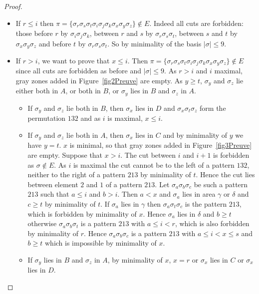 \documentclass[11pt]{article}
\begin{document}
\begin{proof}
\begin{itemize}
\begin{itemize}
\item If $r \leq i$ then $\pi = \{\sigma_r \sigma_s \sigma_t \sigma_i \sigma_j \sigma_k \sigma_x \sigma_y \sigma_z\} \notin E$. 
Indeed all cuts are forbidden: 
those before $r$ by $\sigma_i \sigma_j \sigma_k$, between $r$ and $s$ by $\sigma_r \sigma_s \sigma_t$, between $s$ and $t$ by $\sigma_x \sigma_y \sigma_z$ and before $t$ by $\sigma_r \sigma_s \sigma_t$. 
So by minimality of the basis $|\sigma| \leq 9$.
\item If $r > i$, we want to prove that $x \leq i$. 
Then $\pi = \{\sigma_r \sigma_s \sigma_t \sigma_i \sigma_j \sigma_k \sigma_x \sigma_y \sigma_z\} \notin E$ since all cuts are forbidden as before and $|\sigma| \leq 9$.
As $r > i$ and $i$ maximal, gray zones added in Figure~\ref{fig2Preuve} are empty. 
As $y \geq t$, $\sigma_y$ and $\sigma_z$ lie either both in $A$, or both in $B$, or $\sigma_y$ lies in $B$ and $\sigma_z$ in $A$.
\begin{itemize}
\item If $\sigma_y$ and $\sigma_z$ lie both in $B$, then $\sigma_x$ lies in $D$ and $\sigma_x \sigma_t \sigma_z$ form the permutation $132$ and as $i$ is maximal, $x \leq i$.
\item If $\sigma_y$ and $\sigma_z$ lie both in $A$, then $\sigma_x$ lies in $C$ and by minimality of $y$ we have $y = t$. 
$x$ is minimal, so that gray zones added in Figure~\ref{fig3Preuve} are empty. 
Suppose that $x > i$. 
The cut between $i$ and $i + 1$ is forbidden as $\sigma \notin E$. 
As $i$ is maximal the cut cannot be to the left of a pattern $132$, neither to the right of a pattern $213$ by minimality of $t$. 
Hence the cut lies between element $2$ and $1$ of a pattern $213$. 
Let $\sigma_a \sigma_b \sigma_c$ be such a pattern $213$ such that $a \leq i$ and $b > i$. 
Then $a < x$ and $\sigma_a$ lies in area $\gamma$ or $\delta$ and $c \geq t$ by minimality of $t$. 
If $\sigma_a$ lies in $\gamma$ then $\sigma_a \sigma_t \sigma_c$ is the pattern $213$, which is forbidden by minimality of $x$. 
Hence $\sigma_a$ lies in $\delta$ and $b \geq t$ otherwise $\sigma_a \sigma_b \sigma_t$ is a pattern $213$ with $a \leq i < r$, which is also forbidden by minimality of $r$. 
Hence $\sigma_a \sigma_b \sigma_c$ is a pattern $213$ with $a \leq i < x \leq s$ and $b \geq t$ which is impossible by minimality of $x$.
\item If $\sigma_y$ lies in $B$ and $\sigma_z$ in $A$, by minimality of $x$, $x = r$ or $\sigma_x$ lies in $C$ or $\sigma_x$ lies in $D$. 

\end{itemize}
\end{itemize}
\end{itemize}
\end{proof}
\end{document}
